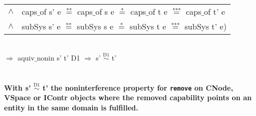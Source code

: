 \begin{itemize}
\begin{tabular}{ll}
$\wedge$ & caps$\_$of s' e $\overset{\text{**}}{=}$ caps$\_$of s e $\overset{\text{*}}{=}$ caps$\_$of t e $\overset{\text{***}}{=}$ caps$\_$of t' e \\
$\wedge$ & subSys s' e $\overset{\text{**}}{=}$ subSys s e $\overset{\text{*}}{=}$ subSys t e $\overset{\text{***}}{=}$ subSys t' e)
\end{tabular} \\
$\Rightarrow$ aquiv$\_$nonin s' t' D1 $\Rightarrow$ s' $\overset{\text{D1}}{\sim}$ t' \\ \\ \\
\textbf{With s' $\overset{\text{D1}}{\sim}$ t' the noninterference property for \texttt{remove} on CNode, VSpace or IContr objects where the removed capability points on an entity in the same domain is fulfilled.}  
\clearpage
\end{itemize}
